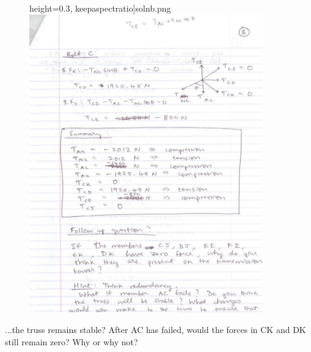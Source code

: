 {\begin{figure}[ht!]
	           height=0.3\textheight,
		   keepaspectratio]{solnb.png}
  \includegraphics[width=0.9\textwidth,
	           height=0.3\textheight,
		   keepaspectratio]{solnc.png}
\end{figure}

...the truss remains stable?  After AC has failed, would the forces in CK and DK still remain zero?  Why or why not?

}{%
}%
